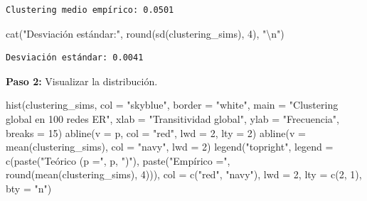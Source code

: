 \documentclass[
  letterpaper,
  DIV=11,
  numbers=noendperiod]{scrreprt}
\newenvironment{Shaded}{\begin{snugshade}}{\end{snugshade}}
\newcommand{\AttributeTok}[1]{\textcolor[rgb]{0.40,0.45,0.13}{#1}}
\newcommand{\DecValTok}[1]{\textcolor[rgb]{0.68,0.00,0.00}{#1}}
\newcommand{\FunctionTok}[1]{\textcolor[rgb]{0.28,0.35,0.67}{#1}}
\newcommand{\NormalTok}[1]{\textcolor[rgb]{0.00,0.23,0.31}{#1}}
\newcommand{\SpecialCharTok}[1]{\textcolor[rgb]{0.37,0.37,0.37}{#1}}
\newcommand{\StringTok}[1]{\textcolor[rgb]{0.13,0.47,0.30}{#1}}
\begin{document}
\begin{tcolorbox}
\begin{verbatim}
Clustering medio empírico: 0.0501 
\end{verbatim}

\begin{Shaded}
\begin{Highlighting}[]
\FunctionTok{cat}\NormalTok{(}\StringTok{"Desviación estándar:"}\NormalTok{, }\FunctionTok{round}\NormalTok{(}\FunctionTok{sd}\NormalTok{(clustering\_sims), }\DecValTok{4}\NormalTok{), }\StringTok{"}\SpecialCharTok{\textbackslash{}n}\StringTok{"}\NormalTok{)}
\end{Highlighting}
\end{Shaded}

\begin{verbatim}
Desviación estándar: 0.0041 
\end{verbatim}

\textbf{Paso 2:} Visualizar la distribución.

\begin{Shaded}
\begin{Highlighting}[]
\FunctionTok{hist}\NormalTok{(clustering\_sims,}
     \AttributeTok{col =} \StringTok{"skyblue"}\NormalTok{, }\AttributeTok{border =} \StringTok{"white"}\NormalTok{,}
     \AttributeTok{main =} \StringTok{"Clustering global en 100 redes ER"}\NormalTok{,}
     \AttributeTok{xlab =} \StringTok{"Transitividad global"}\NormalTok{,}
     \AttributeTok{ylab =} \StringTok{"Frecuencia"}\NormalTok{,}
     \AttributeTok{breaks =} \DecValTok{15}\NormalTok{)}
\FunctionTok{abline}\NormalTok{(}\AttributeTok{v =}\NormalTok{ p, }\AttributeTok{col =} \StringTok{"red"}\NormalTok{, }\AttributeTok{lwd =} \DecValTok{2}\NormalTok{, }\AttributeTok{lty =} \DecValTok{2}\NormalTok{)}
\FunctionTok{abline}\NormalTok{(}\AttributeTok{v =} \FunctionTok{mean}\NormalTok{(clustering\_sims), }\AttributeTok{col =} \StringTok{"navy"}\NormalTok{, }\AttributeTok{lwd =} \DecValTok{2}\NormalTok{)}
\FunctionTok{legend}\NormalTok{(}\StringTok{"topright"}\NormalTok{,}
       \AttributeTok{legend =} \FunctionTok{c}\NormalTok{(}\FunctionTok{paste}\NormalTok{(}\StringTok{"Teórico (p ="}\NormalTok{, p, }\StringTok{")"}\NormalTok{), }
                  \FunctionTok{paste}\NormalTok{(}\StringTok{"Empírico ="}\NormalTok{, }\FunctionTok{round}\NormalTok{(}\FunctionTok{mean}\NormalTok{(clustering\_sims), }\DecValTok{4}\NormalTok{))),}
       \AttributeTok{col =} \FunctionTok{c}\NormalTok{(}\StringTok{"red"}\NormalTok{, }\StringTok{"navy"}\NormalTok{), }\AttributeTok{lwd =} \DecValTok{2}\NormalTok{, }\AttributeTok{lty =} \FunctionTok{c}\NormalTok{(}\DecValTok{2}\NormalTok{, }\DecValTok{1}\NormalTok{),}
       \AttributeTok{bty =} \StringTok{"n"}\NormalTok{)}
\end{Highlighting}
\end{Shaded}


\end{tcolorbox}
\end{document}
